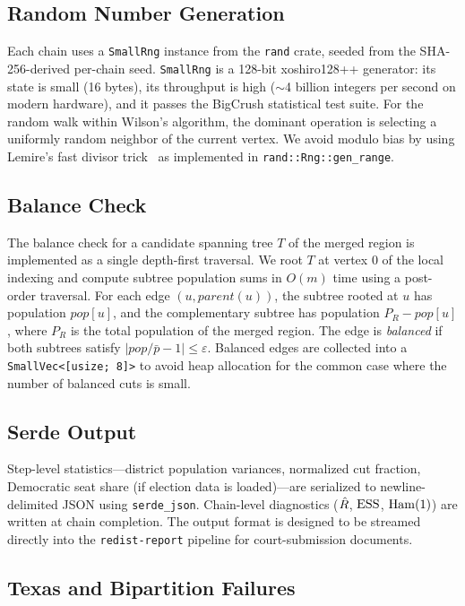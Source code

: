 \subsection{Random Number Generation}
\label{ssec:rng}

Each chain uses a \texttt{SmallRng} instance from the \texttt{rand} crate,
seeded from the SHA-256-derived per-chain seed.
\texttt{SmallRng} is a 128-bit xoshiro128++ generator: its state is small
(16 bytes), its throughput is high ($\sim$4 billion integers per second
on modern hardware), and it passes the BigCrush statistical test suite.
For the random walk within Wilson's algorithm, the dominant operation is
selecting a uniformly random neighbor of the current vertex.
We avoid modulo bias by using Lemire's fast divisor trick~\citep{lemire2019fast}
as implemented in \texttt{rand::Rng::gen\_range}.

\subsection{Balance Check}

The balance check for a candidate spanning tree $T$ of the merged region
is implemented as a single depth-first traversal.
We root $T$ at vertex 0 of the local indexing and compute subtree
population sums in $O(m)$ time using a post-order traversal.
For each edge $(u, \mathit{parent}(u))$, the subtree rooted at $u$ has
population $\mathit{pop}[u]$, and the complementary subtree has
population $P_R - \mathit{pop}[u]$, where $P_R$ is the total population
of the merged region.
The edge is \emph{balanced} if both subtrees satisfy
$|\mathit{pop}/\bar{p} - 1| \leq \varepsilon$.
Balanced edges are collected into a \texttt{SmallVec<[usize; 8]>} to
avoid heap allocation for the common case where the number of balanced
cuts is small.

\subsection{Serde Output}

Step-level statistics---district population variances, normalized cut
fraction, Democratic seat share (if election data is loaded)---are
serialized to newline-delimited JSON using \texttt{serde\_json}.
Chain-level diagnostics ($\hat{R}$, $\mathrm{ESS}$, $\mathrm{Ham}(1)$) are written at
chain completion.
The output format is designed to be streamed directly into the
\texttt{redist-report} pipeline for court-submission documents.

\subsection{Texas and Bipartition Failures}

